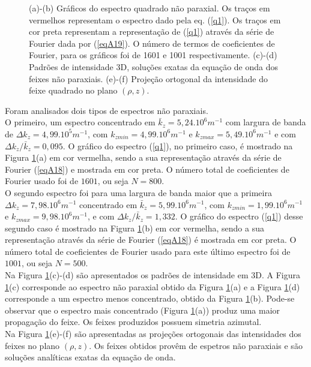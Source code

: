 \begin{figure}[h]
\caption{(a)-(b) Gr\'aficos do espectro quadrado n\~ao paraxial. Os tra\c{c}os em vermelhos representam o espectro dado pela eq. (\ref{q1}). Os tra\c{c}os em cor preta representam a representa\c{c}\~ao de (\ref{q1}) atrav\'es da s\'erie de Fourier dada por (\ref{eqA19}). O n\'umero de termos de coeficientes de Fourier, para os  gr\'aficos foi de 1601 e 1001 respectivamente. (c)-(d) Padr\~oes de intensidade 3D, solu\c{c}\~oes exatas da equa\c{c}\~ao de onda dos feixes n\~ao paraxiais. (e)-(f) Proje\c{c}\~ao ortogonal da intensidade do feixe quadrado no plano $(\rho,z)$.}
\label{fig2}
\end{figure}
Foram analisados dois tipos de espectros n\~ao paraxiais.\\
O primeiro, um espectro concentrado em $\bar{k}_z=5,24.10^{6}m^{-1}$ com largura de banda de $\Delta k_z= 4,99.10^{5}m^{-1}$, com $k_{zmin}=4,99.10^{6}m^{-1}$ e $k_{zmax}=5,49.10^{6}m^{-1}$ e com $\Delta k_z/\bar{k}_z=0,095$. O gr\'afico do espectro (\ref{q1}), no primeiro caso, \'e mostrado na Figura \ref{fig2}(a) em cor vermelha, sendo a sua representa\c{c}\~ao atrav\'es da s\'erie de Fourier (\ref{eqA18}) e mostrada em cor preta. O n\'umero total de coeficientes de Fourier usado foi de $1601$, ou seja $N=800$.\\
O segundo espectro foi para uma largura de banda maior que a primeira $\Delta k_z= 7,98.10^{6}m^{-1}$ concentrado em $\bar{k}_z=5,99.10^{6}m^{-1} $, com $k_{zmin}=1,99.10^{6}m^{-1}$ e $k_{zmax}=9,98.10^{6}m^{-1}$, e com $\Delta k_z/\bar{k}_z=1,332$. O gr\'afico do espectro (\ref{q1}) desse segundo caso \'e mostrado na Figura \ref{fig2}(b) em cor vermelha, sendo a sua representa\c{c}\~ao atrav\'es da s\'erie de Fourier (\ref{eqA18}) \'e mostrada em cor preta. O n\'umero total de coeficientes de Fourier usado para este \'ultimo espectro foi de $1001$, ou seja $N=500$.\\
Na Figura \ref{fig2}(c)-(d) s\~ao apresentados os padr\~oes de intensidade em 3D. A Figura \ref{fig2}(c) corresponde ao espectro n\~ao paraxial obtido da Figura \ref{fig2}(a) e a Figura \ref{fig2}(d) corresponde a um espectro menos concentrado, obtido da Figura \ref{fig2}(b). Pode-se observar que o espectro mais concentrado (Figura \ref{fig2}(a)) produz uma maior propaga\c{c}\~ao do feixe. Os feixes produzidos possuem simetria azimutal.\\
Na Figura \ref{fig2}(e)-(f) s\~ao apresentadas as proje\c{c}\~oes ortogonais das intensidades dos feixes no plano $(\rho,z)$.  Os feixes obtidos prov\^em de espetros n\~ao paraxiais e s\~ao solu\c{c}\~oes anal\'iticas exatas da equa\c{c}\~ao de onda.\\
